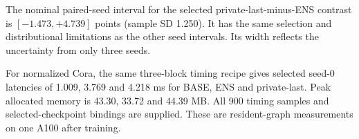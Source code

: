 The nominal paired-seed interval for the selected private-last-minus-ENS
contrast is $[-1.473,+4.739]$ points (sample SD 1.250).
It has the same selection and distributional limitations as the other
seed intervals. Its width reflects the uncertainty from only three seeds.

For normalized Cora, the same three-block timing recipe gives selected
seed-0 latencies of 1.009, 3.769 and 4.218 ms for BASE, ENS and
private-last. Peak allocated memory is 43.30, 33.72 and 44.39 MB.
All 900 timing samples and selected-checkpoint bindings are supplied.
These are resident-graph measurements on one A100 after training.
